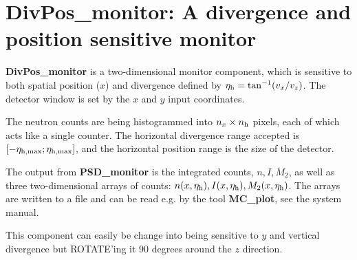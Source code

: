 
\section{DivPos\_monitor: A divergence and position sensitive monitor}

{\bf DivPos\_monitor} is a two-dimensional monitor component,
which is sensitive to both spatial position ($x$) and divergence
defined by $\eta_{\rm h} = \tan^{-1}(v_x/v_z)$.
The detector window is set
by the $x$ and $y$ input coordinates.

The neutron counts are being histogrammed
into $n_x \times n_{\rm h}$ pixels, each of which acts like a single
counter. The horizontal divergence range accepted is
$[-\eta_{\rm h,max}; \eta_{\rm h,max}]$, and the horizontal position
range is the size of the detector.

The output from {\bf PSD\_monitor} is the integrated counts, $n, I, M_2$,
as well as
three two-dimensional arrays of counts: $n(x,\eta_{\rm h}),
I(x,\eta_{\rm h}), M_2(x,\eta_{\rm h})$.
The arrays are written to a file and can be read e.g. by the tool
{\bf MC\_plot}, see the system manual.

This component can easily be change into being sensitive
to $y$ and vertical divergence but ROTATE'ing it
90 degrees around the $z$ direction.